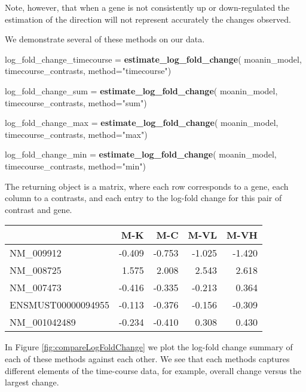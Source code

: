 \documentclass[9pt,a4paper,]{extarticle}
\newenvironment{Shaded}{\begin{snugshade}}{\end{snugshade}}
\newcommand{\DataTypeTok}[1]{\textcolor[rgb]{0.13,0.29,0.53}{#1}}
\newcommand{\KeywordTok}[1]{\textcolor[rgb]{0.13,0.29,0.53}{\textbf{#1}}}
\newcommand{\NormalTok}[1]{#1}
\newcommand{\StringTok}[1]{\textcolor[rgb]{0.31,0.60,0.02}{#1}}
\begin{document}
Note, however, that when a gene is not consistently up or down-regulated the estimation
of the direction will not represent accurately the changes observed.

We demonstrate several of these methods on our data.

\begin{Shaded}
\begin{Highlighting}[]
\NormalTok{log_fold_change_timecourse =}\StringTok{ }\KeywordTok{estimate_log_fold_change}\NormalTok{(}
\NormalTok{    moanin_model, timecourse_contrasts,  }\DataTypeTok{method=}\StringTok{"timecourse"}\NormalTok{)}

\NormalTok{log_fold_change_sum =}\StringTok{ }\KeywordTok{estimate_log_fold_change}\NormalTok{(}
\NormalTok{    moanin_model, timecourse_contrasts,  }\DataTypeTok{method=}\StringTok{"sum"}\NormalTok{)}

\NormalTok{log_fold_change_max =}\StringTok{ }\KeywordTok{estimate_log_fold_change}\NormalTok{(}
\NormalTok{    moanin_model, timecourse_contrasts, }\DataTypeTok{method=}\StringTok{"max"}\NormalTok{)}

\NormalTok{log_fold_change_min =}\StringTok{ }\KeywordTok{estimate_log_fold_change}\NormalTok{(}
\NormalTok{    moanin_model, timecourse_contrasts, }\DataTypeTok{method=}\StringTok{"min"}\NormalTok{)}
\end{Highlighting}
\end{Shaded}

The returning object is a matrix, where each row corresponds to a gene,
each column to a contrasts, and each entry to the log-fold change for this
pair of contrast and gene.

\begin{tabular}{lrrrr}
\toprule
  & M-K & M-C & M-VL & M-VH\\
\midrule
NM\_009912 & -0.409 & -0.753 & -1.025 & -1.420\\
NM\_008725 & 1.575 & 2.008 & 2.543 & 2.618\\
NM\_007473 & -0.416 & -0.335 & -0.213 & 0.364\\
ENSMUST00000094955 & -0.113 & -0.376 & -0.156 & -0.309\\
NM\_001042489 & -0.234 & -0.410 & 0.308 & 0.430\\
\bottomrule
\end{tabular}

In Figure \ref{fig:compareLogFoldChange} we plot the log-fold change summary of each of these methods against each other. We see that each methods captures different elements of
the time-course data, for example, overall change versus the largest change.
\end{document}
